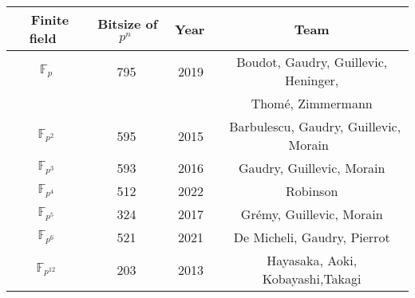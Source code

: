 \documentclass[preview]{standalone}
\begin{document}
\begin{center}
\begin{tabular}{|c|c|c|c|}
   \hline
     $ \,$ Finite field $ \,$ &$ \,$Bitsize of $p^n \,$ &$ \,$ Year$ \,$& $ \,$ Team $ \,$\\
     \hline
     $\mathbb{F}_p$ & 795 & 2019 & Boudot, Gaudry, Guillevic, Heninger, \\
     &&&Thom\'{e}, Zimmermann\\ 
     $\mathbb{F}_{p^2}$ &  595 & 2015 & $ \,$ Barbulescu, Gaudry, Guillevic, Morain $\,$ \\ 
     $\mathbb{F}_{p^3}$ & 593 & 2016 & Gaudry, Guillevic, Morain \\ 
     $\mathbb{F}_{p^4}$ & 512& 2022 & Robinson \\ 
      $\mathbb{F}_{p^5}$ & 324& 2017 & Gr\'{e}my, Guillevic, Morain \\ 
      $\mathbb{F}_{p^6}$ & 521& 2021 & De Micheli, Gaudry, Pierrot\\
      $\mathbb{F}_{p^{12}}$ & 203& 2013 &Hayasaka, Aoki, Kobayashi,Takagi \\
     \hline
   \end{tabular}
\end{center}
\end{document}
